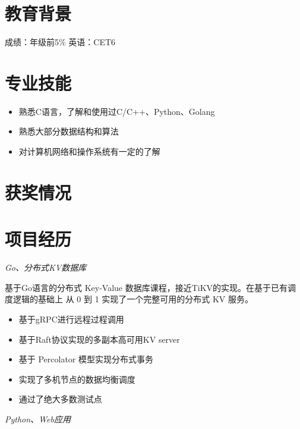 \documentclass{uniquecv}
\begin{document}

\medskip




\section{教育背景}
成绩：年级前5\% \quad 英语：CET6



\section{专业技能}
\smallskip
\begin{itemize}
\item 熟悉C语言，了解和使用过C/C++、Python、Golang
\item 熟悉大部分数据结构和算法
\item 对计算机网络和操作系统有一定的了解
\end{itemize}


\section{获奖情况}
\medskip


\section{项目经历}

\textit{Go、分布式KV数据库}
\vspace{0.4ex}


基于Go语言的分布式 Key-Value 数据库课程，接近TiKV的实现。在基于已有调度逻辑的基础上
从 0 到 1 实现了一个完整可用的分布式 KV 服务。
\begin{itemize}
  \item 基于gRPC进行远程过程调用
  \item 基于Raft协议实现的多副本高可用KV server
  \item 基于 Percolator 模型实现分布式事务
  \item 实现了多机节点的数据均衡调度
  \item 通过了绝大多数测试点
\end{itemize}
\textit{Python、Web应用}
\vspace{0.4ex}
\end{document}
